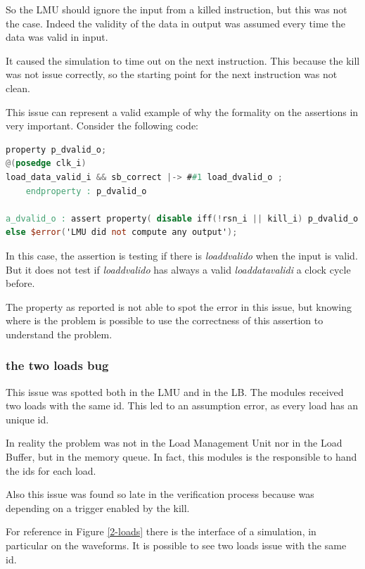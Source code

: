 So the LMU should ignore the input from a killed instruction, but this was not the case. Indeed the validity of the data in output was assumed every time the data was valid in input.

It caused the simulation to time out on the next instruction. This because the kill was not issue correctly, so the starting point for the next instruction was not clean.

This issue can represent a valid example of why the formality on the assertions in very important.
Consider the following code:


\linespread{1}
\begin{lstlisting}[language=Verilog,style=verilog-style, backgroundcolor=\color{lyel_palette}, frame=tlb]
property p_dvalid_o;
@(posedge clk_i)
load_data_valid_i && sb_correct |-> ##1 load_dvalid_o ;
	endproperty : p_dvalid_o

a_dvalid_o : assert property( disable iff(!rsn_i || kill_i) p_dvalid_o )
else $error('LMU did not compute any output');
\end{lstlisting}
\linespread{1.2}

In this case, the assertion is testing if there is \emph{load\+dvalid\+o} when the input is valid. But it does not test if \emph{load\+dvalid\+o} has always a valid \emph{load\+data\+valid\+i} a clock cycle before.

The property as reported is not able to spot the error in this issue, but knowing where is the problem is possible to use the correctness of this assertion to understand the problem.

\subsubsection{the two loads bug}
This issue was spotted both in the LMU and in the LB. The modules received two loads with the same id. This led to an assumption error, as every load has an unique id.

In reality the problem was not in the Load Management Unit nor in the Load Buffer, but in the memory queue. In fact, this modules is the responsible to hand the ids for each load.

Also this issue was found so late in the verification process because was depending on a trigger enabled by the kill.

For reference in Figure \ref{2-loads} there is the interface of a simulation, in particular on the waveforms. It is possible to see two loads issue with the same id.

